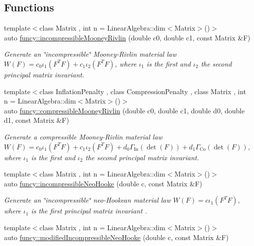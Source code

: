 \subsection*{Functions}
\begin{DoxyCompactItemize}
\item 
{\footnotesize template$<$class Matrix , int n = Linear\-Algebra\-::dim$<$\-Matrix$>$()$>$ }\\auto \hyperlink{group__Rubber_gacbf67f93c8dc330013448669410822f3}{funcy\-::incompressible\-Mooney\-Rivlin} (double c0, double c1, const Matrix \&F)
\begin{DoxyCompactList}\small\item\em Generate an \char`\"{}incompressible\char`\"{} Mooney-\/\-Rivlin material law $ W(F)=c_0\iota_1(F^T F) + c_1\iota_2(F^T F) $, where $\iota_1$ is the first and $\iota_2$ the second principal matrix invariant. \end{DoxyCompactList}\item 
{\footnotesize template$<$class Inflation\-Penalty , class Compression\-Penalty , class Matrix , int n = Linear\-Algebra\-::dim$<$\-Matrix$>$()$>$ }\\auto \hyperlink{group__Rubber_ga335b92acb5e3b72e760fe5a3d536e276}{funcy\-::compressible\-Mooney\-Rivlin} (double c0, double c1, double d0, double d1, const Matrix \&F)
\begin{DoxyCompactList}\small\item\em Generate a compressible Mooney-\/\-Rivlin material law $ W(F)=c_0\iota_1(F^T F) + c_1\iota_2(F^T F) + d_0\Gamma_\mathrm{In}(\det(F))+d_1\Gamma_\mathrm{Co}(\det(F)) $, where $\iota_1$ is the first and $\iota_2$ the second principal matrix invariant. \end{DoxyCompactList}\item 
{\footnotesize template$<$class Matrix , int n = Linear\-Algebra\-::dim$<$\-Matrix$>$()$>$ }\\auto \hyperlink{group__Rubber_gad0d93d6dfb3693483fcd37144959de24}{funcy\-::incompressible\-Neo\-Hooke} (double c, const Matrix \&F)
\begin{DoxyCompactList}\small\item\em Generate an \char`\"{}incompressible\char`\"{} neo-\/\-Hookean material law $ W(F)=c\iota_1(F^T F) $, where $\iota_1$ is the first principal matrix invariant . \end{DoxyCompactList}\item 
{\footnotesize template$<$class Matrix , int n = Linear\-Algebra\-::dim$<$\-Matrix$>$()$>$ }\\auto \hyperlink{group__Rubber_gae9f87c6f1fd4edddd0894edefd9fb9a5}{funcy\-::modified\-Incompressible\-Neo\-Hooke} (double c, const Matrix \&F)

\end{DoxyCompactItemize}
